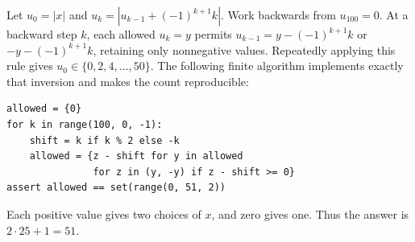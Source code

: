 Let $u_0=|x|$ and $u_k=|u_{k-1}+(-1)^{k+1}k|$. Work backwards from $u_{100}=0$. At a backward step $k$, each allowed $u_k=y$ permits $u_{k-1}=y-(-1)^{k+1}k$ or $-y-(-1)^{k+1}k$, retaining only nonnegative values. Repeatedly applying this rule gives $u_0\in\{0,2,4,\ldots,50\}$. The following finite algorithm implements exactly that inversion and makes the count reproducible:
\begin{verbatim}
allowed = {0}
for k in range(100, 0, -1):
    shift = k if k % 2 else -k
    allowed = {z - shift for y in allowed
               for z in (y, -y) if z - shift >= 0}
assert allowed == set(range(0, 51, 2))
\end{verbatim}
Each positive value gives two choices of $x$, and zero gives one. Thus the answer is $2\cdot25+1=\boxed{51}$.
